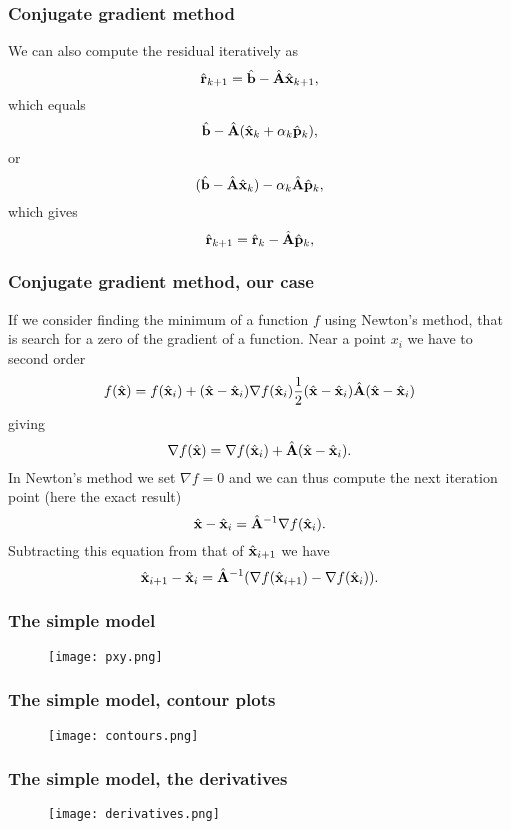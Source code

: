 \documentclass[compress]{beamer}
\begin{document}
\frame
{
  \frametitle{Conjugate gradient method}
\begin{small}
{\scriptsize
We can also  compute the residual iteratively as
\[
\hat{\bf {r}}_{k+1}=\hat{\bf {b}}-\hat{\bf {A}}\hat{\bf {x}}_{k+1},
 \]
which equals
\[
\hat{\bf {b}}-\hat{\bf {A}}(\hat{\bf {x}}_k+\alpha_k\hat{\bf {p}}_k),
 \]
or
\[
(\hat{\bf {b}}-\hat{\bf {A}}\hat{\bf {x}}_k)-\alpha_k\hat{\bf {A}}\hat{\bf {p}}_k,
 \]
which gives
\[
\hat{\bf {r}}_{k+1}=\hat{\bf {r}}_k-\hat{\bf {A}}\hat{\bf {p}}_{k},
 \]
}
\end{small}
}



\frame
{
  \frametitle{Conjugate gradient method, our case}
\begin{small}
{\scriptsize
If we consider finding the minimum of a function $f$ using Newton's method,
that is search for a zero of the gradient of a function.  Near a point $x_i$
we have to second order
\[
f(\hat{\bf {x}})=f(\hat{\bf {x}}_i)+(\hat{\bf {x}}-\hat{\bf {x}}_i)\nabla f(\hat{\bf {x}}_i)
\frac{1}{2}(\hat{\bf {x}}-\hat{\bf {x}}_i)\hat{\bf {A}}(\hat{\bf {x}}-\hat{\bf {x}}_i)
\]
giving
\[
\nabla f(\hat{\bf {x}})=\nabla f(\hat{\bf {x}}_i)+\hat{\bf {A}}(\hat{\bf {x}}-\hat{\bf {x}}_i).
 \]
In Newton's method we set $\nabla f = 0$ and we can thus compute the next iteration point
(here the exact result)
\[
\hat{\bf {x}}-\hat{\bf {x}}_i=\hat{\bf {A}}^{-1}\nabla f(\hat{\bf {x}}_i).
\]
Subtracting this equation from that of $\hat{\bf {x}}_{i+1}$ we have
\[
\hat{\bf {x}}_{i+1}-\hat{\bf {x}}_i=\hat{\bf {A}}^{-1}(\nabla f(\hat{\bf {x}}_{i+1})-\nabla f(\hat{\bf {x}}_i)).
\]
}
\end{small}
}


\frame
{
  \frametitle{The simple model}
      \begin{figure}[htp]
        \texttt{[image: pxy.png]}
      \end{figure}
}


\frame
{
  \frametitle{The simple model, contour plots}
      \begin{figure}[htp]
        \texttt{[image: contours.png]}
      \end{figure}
}


\frame
{
  \frametitle{The simple model, the derivatives}
      \begin{figure}[htp]
        \texttt{[image: derivatives.png]}
      \end{figure}
}
\end{document}
